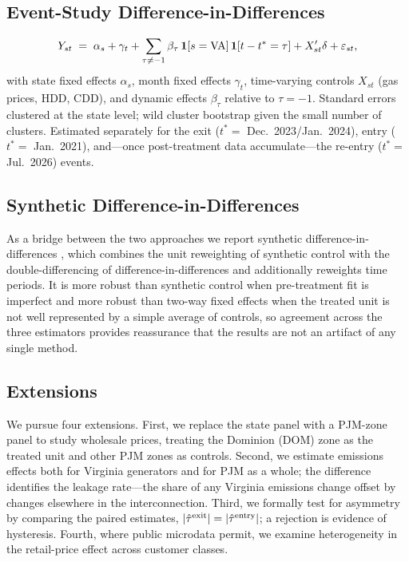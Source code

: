 \documentclass[12pt]{article}
\begin{document}
\subsection{Event-Study Difference-in-Differences}\label{sec:did}
\begin{equation}\label{eq:eventstudy}
  Y_{st} \;=\; \alpha_s + \gamma_t
  + \sum_{\tau \neq -1} \beta_\tau \,\mathbf{1}[s=\text{VA}]\,\mathbf{1}[t-t^\ast=\tau]
  + X_{st}'\delta + \varepsilon_{st},
\end{equation}
with state fixed effects $\alpha_s$, month fixed effects $\gamma_t$, time-varying controls
$X_{st}$ (gas prices, HDD, CDD), and dynamic effects $\beta_\tau$ relative to $\tau=-1$.
Standard errors clustered at the state level; wild cluster bootstrap given the small number
of clusters. Estimated separately for the exit ($t^\ast=$ Dec.\ 2023/Jan.\ 2024), entry
($t^\ast=$ Jan.\ 2021), and---once post-treatment data accumulate---the re-entry
($t^\ast=$ Jul.\ 2026) events.

\subsection{Synthetic Difference-in-Differences}\label{sec:sdid}
As a bridge between the two approaches we report synthetic difference-in-differences
\citep{Arkhangelsky2021_sdid}, which combines the unit reweighting of synthetic control with
the double-differencing of difference-in-differences and additionally reweights time periods.
It is more robust than synthetic control when pre-treatment fit is imperfect and more robust
than two-way fixed effects when the treated unit is not well represented by a simple average
of controls, so agreement across the three estimators provides reassurance that the results are
not an artifact of any single method.

\subsection{Extensions}\label{sec:extensions}
We pursue four extensions. First, we replace the state panel with a PJM-zone panel to study
wholesale prices, treating the Dominion (DOM) zone as the treated unit and other PJM zones as
controls. Second, we estimate emissions effects both for Virginia generators and for PJM as a
whole; the difference identifies the leakage rate---the share of any Virginia emissions change
offset by changes elsewhere in the interconnection. Third, we formally test for asymmetry by
comparing the paired estimates, $|\hat{\tau}^{\text{exit}}| = |\hat{\tau}^{\text{entry}}|$; a rejection is evidence of
hysteresis. Fourth, where public microdata permit, we examine heterogeneity in the retail-price
effect across customer classes.
\end{document}
